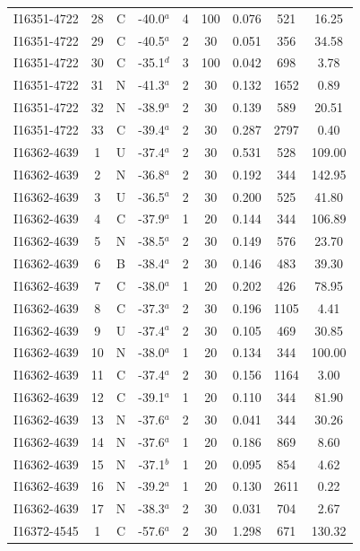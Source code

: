 \begin{table}
\begin{tabular}{ccccccccc}
I16351-4722 & 28 & C & -40.0$^{a}$ & 4 & 100 & 0.076 & 521 & 16.25 \\
I16351-4722 & 29 & C & -40.5$^{a}$ & 2 & 30 & 0.051 & 356 & 34.58 \\
I16351-4722 & 30 & C & -35.1$^{d}$ & 3 & 100 & 0.042 & 698 & 3.78 \\
I16351-4722 & 31 & N & -41.3$^{a}$ & 2 & 30 & 0.132 & 1652 & 0.89 \\
I16351-4722 & 32 & N & -38.9$^{a}$ & 2 & 30 & 0.139 & 589 & 20.51 \\
I16351-4722 & 33 & C & -39.4$^{a}$ & 2 & 30 & 0.287 & 2797 & 0.40 \\
I16362-4639 & 1 & U & -37.4$^{a}$ & 2 & 30 & 0.531 & 528 & 109.00 \\
I16362-4639 & 2 & N & -36.8$^{a}$ & 2 & 30 & 0.192 & 344 & 142.95 \\
I16362-4639 & 3 & U & -36.5$^{a}$ & 2 & 30 & 0.200 & 525 & 41.80 \\
I16362-4639 & 4 & C & -37.9$^{a}$ & 1 & 20 & 0.144 & 344 & 106.89 \\
I16362-4639 & 5 & N & -38.5$^{a}$ & 2 & 30 & 0.149 & 576 & 23.70 \\
I16362-4639 & 6 & B & -38.4$^{a}$ & 2 & 30 & 0.146 & 483 & 39.30 \\
I16362-4639 & 7 & C & -38.0$^{a}$ & 1 & 20 & 0.202 & 426 & 78.95 \\
I16362-4639 & 8 & C & -37.3$^{a}$ & 2 & 30 & 0.196 & 1105 & 4.41 \\
I16362-4639 & 9 & U & -37.4$^{a}$ & 2 & 30 & 0.105 & 469 & 30.85 \\
I16362-4639 & 10 & N & -38.0$^{a}$ & 1 & 20 & 0.134 & 344 & 100.00 \\
I16362-4639 & 11 & C & -37.4$^{a}$ & 2 & 30 & 0.156 & 1164 & 3.00 \\
I16362-4639 & 12 & C & -39.1$^{a}$ & 1 & 20 & 0.110 & 344 & 81.90 \\
I16362-4639 & 13 & N & -37.6$^{a}$ & 2 & 30 & 0.041 & 344 & 30.26 \\
I16362-4639 & 14 & N & -37.6$^{a}$ & 1 & 20 & 0.186 & 869 & 8.60 \\
I16362-4639 & 15 & N & -37.1$^{b}$ & 1 & 20 & 0.095 & 854 & 4.62 \\
I16362-4639 & 16 & N & -39.2$^{a}$ & 1 & 20 & 0.130 & 2611 & 0.22 \\
I16362-4639 & 17 & N & -38.3$^{a}$ & 2 & 30 & 0.031 & 704 & 2.67 \\
I16372-4545 & 1 & C & -57.6$^{a}$ & 2 & 30 & 1.298 & 671 & 130.32 \\

\end{tabular}
\end{table}
